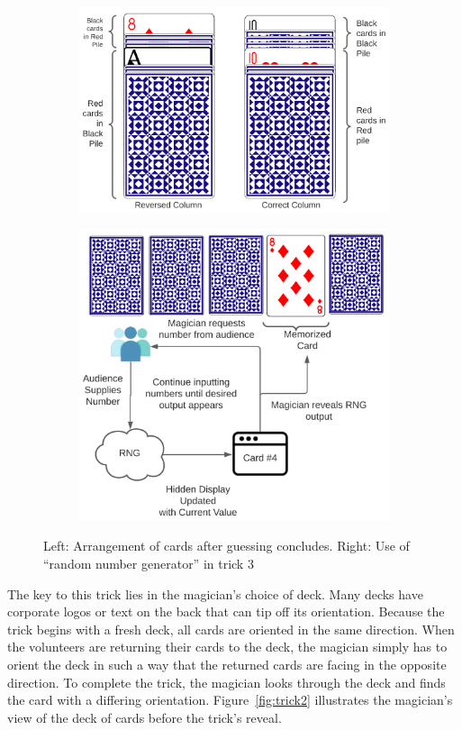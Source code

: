 \begin{figure}
\centering
\begin{subfigure}{.5\textwidth}
\includegraphics[width=.8\linewidth]{images/Trick1}
\label{fig:trick1}
\end{subfigure}%
\begin{subfigure}{.5\textwidth}
\centering
\includegraphics[width=.8\linewidth]{images/Trick3}
\label{fig:trick1and3}
\end{subfigure}
\caption{Left: Arrangement of cards after guessing concludes.  Right: Use of ``random number generator'' in trick 3}
\end{figure}

The key to this trick lies in the magician's choice of deck.  Many
decks
have corporate logos or
text on the back that can 
tip off its orientation.  Because the trick
begins with a fresh deck, all cards are oriented in the same direction. When the volunteers are returning their cards to the deck, the magician
simply has to orient the deck in such a way that the returned cards  are facing
in the opposite direction.
To complete the trick, the magician looks through the deck 
and finds the card with a differing orientation.  Figure~\ref{fig:trick2}
illustrates the magician's view of the deck of cards before the trick's
reveal.

